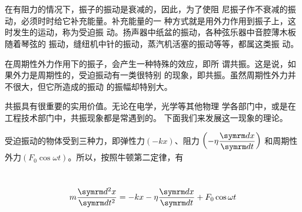 \section[共振]{}\label{sec:07.05}

在有阻力的情况下，振子的振动是衰减的，因此，为了使阻
尼振子作不衰减的振动，必须时时给它补充能量。补充能量的一
种方式就是用外力作用到振子上，这时发生的运动，称为受迫振
动。扬声器中纸盆的振动，各种弦乐器中音腔薄木板随着琴弦的
振动，缝纽机中针的振动，蒸汽机活塞的振动等等，都属这类振
动。

在周期性外力作用下的振子，会产生一种特殊的效应，即所
谓共振。这是说，如果外力是周期性的，受迫振动有一类很特别
的现象，即共振。虽然周期性外力并不很大，但它所造成的振动
的振幅却特别大。

共振具有很重要的实用价值。无论在电学，光学等其他物理
学各部门中，或是在工程技术部门中，共振现象都是常遇到的。
下面我们来发展这一现象的理论。

受迫振动的物体受到三种力，即弹性力$ \left( - k x \right) $、阻力
$ \left( - \eta \dfrac { \dif x } { \dif t } \right) $
和周期性外力$ \left( F _ { 0 } \cos \omega t \right) $。所以，按照牛顿第二定律，有

~\vspace{-1.56em}
\begin{equation*}
  m \frac { \dif ^ { 2 } x } { \dif t ^ { 2 } } = - k x - \eta \frac { \dif x } { \dif t } + F _ { 0 } \cos \omega t
\end{equation*}

